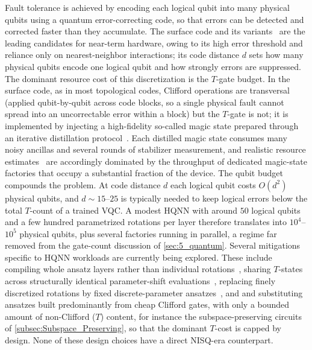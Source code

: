 \documentclass[aps,10pt,groupedaddress,prx,superscriptaddress,twocolumn,balancelastpage, tightenlines]{revtex4-2}
\theoremstyle{plain}  %
\begin{document}
Fault tolerance is achieved by encoding each logical qubit into many physical qubits using a quantum error-correcting code, so that errors can be detected and corrected faster than they accumulate. The surface code and its variants~\cite{fowler_surface_2012} are the leading candidates for near-term hardware, owing to its high error threshold and reliance only on nearest-neighbor interactions; its code distance $d$ sets how many physical qubits encode one logical qubit and how strongly errors are suppressed. The dominant resource cost of this discretization is the $T$-gate budget. In the surface code, as in most topological codes, Clifford operations are transversal (applied qubit-by-qubit across code blocks, so a single physical fault cannot spread into an uncorrectable error within a block) but the $T$-gate is not; it is implemented by injecting a high-fidelity so-called magic state prepared through an iterative distillation protocol~\cite{bravyi_universal_2005, fowler_surface_2012}. Each distilled magic state consumes many noisy ancillas and several rounds of stabilizer measurement, and realistic resource estimates~\cite{litinski_game_2019, beverland_resource_2022} are accordingly dominated by the throughput of dedicated magic-state factories that occupy a substantial fraction of the device. The qubit budget compounds the problem. At code distance $d$ each logical qubit costs $O(d^2)$ physical qubits, and $d \sim 15$--$25$ is typically needed to keep logical errors below the total $T$-count of a trained \gls{VQC}. A modest \gls{HQNN} with around $50$ logical qubits and a few hundred parametrized rotations per layer therefore translates into $10^{4}$--$10^{5}$ physical qubits, plus several factories running in parallel, a regime far removed from the gate-count discussion of \autoref{sec:5_quantum}. Several mitigations specific to \gls{HQNN} workloads are currently being explored. These include compiling whole ansatz layers rather than individual rotations~\cite{Vandaele2024Hadamard, vandeWetering2025Optimal}, sharing $T$-states across structurally identical parameter-shift evaluations~\cite{Sayginel2023FTVQA}, replacing finely discretized rotations by fixed discrete-parameter ansatzes~\cite{Ravi2023CAFQA}, and and substituting ansatzes built predominantly from cheap Clifford gates, with only a bounded amount of non-Clifford ($T$) content, for instance the subspace-preserving circuits of \autoref{subsec:Subspace_Preserving}, so that the dominant $T$-cost is capped by design. None of these design choices have a direct \gls{NISQ}-era counterpart.
\end{document}
